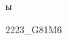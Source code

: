 ы\documentclass[
	10pt,
	paper=A4,
	landscape,
	DIV=calc,
	twocolumn
]{article}
\begin{document}
	{2223_G81M6}
\end{document}
